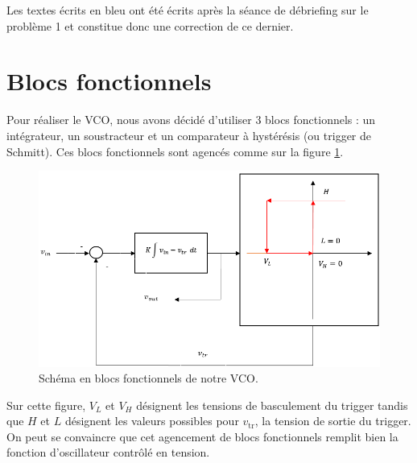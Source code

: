 

\begin{correction}
	Les textes écrits en bleu ont été écrits après
	la séance de débriefing sur le problème 1 et
	constitue donc une correction de ce dernier.
\end{correction}

\section{Blocs fonctionnels}
Pour réaliser le VCO, nous avons décidé d'utiliser 3 blocs
fonctionnels : un intégrateur, un soustracteur et un
comparateur à hystérésis (ou trigger de Schmitt). Ces blocs
fonctionnels sont agencés comme sur la figure \ref{fig:blocs}.

\begin{figure}[ht]
	\centering
	\includegraphics[scale=0.85]{img/blocs-fonctionnels.png}
	\caption{Schéma en blocs fonctionnels de notre VCO.}
	\label{fig:blocs}
\end{figure}

Sur cette figure, $V_L$ et $V_H$ désignent les tensions de
basculement du trigger tandis que $H$ et $L$ désignent
les valeurs possibles pour $v_{\text{tr}}$, la tension de sortie
du trigger. On peut se convaincre que cet agencement de blocs
fonctionnels remplit bien la fonction d'oscillateur contrôlé en tension. 

